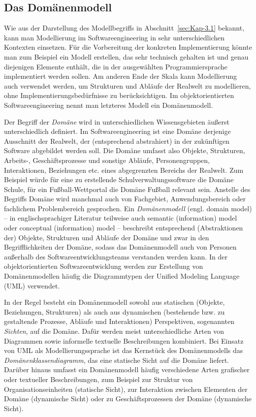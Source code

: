 \subsection{Das Domänenmodell}
\label{sec:Kap-3.2.2}

Wie aus der Darstellung des Modellbegriffs in Abschnitt~\ref{sec:Kap-3.1} bekannt, kann man Modellierung im Softwareengineering in sehr unterschiedlichen Kontexten einsetzen. Für die Vorbereitung der konkreten Implementierung könnte man zum Beispiel ein Modell erstellen, das sehr technisch gehalten ist und genau diejenigen Elemente enthält, die in der ausgewählten Programmiersprache implementiert werden sollen. Am anderen Ende der Skala kann Modellierung auch verwendet werden, um Strukturen und Abläufe der Realwelt zu modellieren, ohne Implementierungsbedürfnisse zu berücksichtigen. Im objektorientierten Softwareengineering nennt man letzteres Modell ein Domänenmodell. 

Der Begriff der \textit{Domäne} 
wird in unterschiedlichen Wissensgebieten äußerst unterschiedlich definiert. Im Softwareengineering ist eine Domäne derjenige Ausschnitt der Realwelt, der (entsprechend abstrahiert) in der zukünftigen Software abgebildet werden soll. Die Domäne umfasst also Objekte, Strukturen, Arbeits-, Geschäfts\-prozesse und sonstige Abläufe, Personengruppen, Interaktionen, Beziehungen etc. eines abgegrenzten Bereichs der Realwelt. Zum Beispiel würde für eine zu erstellende Schulverwaltungssoftware die Domäne Schule, für ein Fußball-Wettportal die Domäne Fußball relevant sein. Anstelle des Begriffs Domäne wird manchmal auch von Fachgebiet, Anwendungsbereich oder fachlichem Problembereich gesprochen. Ein \textit{Domänenmodell}
(engl. domain model) – in englischsprachiger Literatur teilweise auch semantic (information) model oder conceptual (information) model – beschreibt entsprechend (Abstraktionen der) Objekte, Strukturen und Abläufe der Domäne und zwar in den Begrifflichkeiten der Domäne, sodass das Domänenmodell auch von Personen außerhalb des Softwareentwicklungsteams verstanden werden kann. In der objektorientierten Softwareentwicklung werden zur Erstellung von Domänenmodellen häufig die Diagrammtypen der Unified Modeling Language (UML) verwendet.

In der Regel besteht ein Domänenmodell sowohl aus statischen (Objekte, Beziehungen, Strukturen) als auch aus dynamischen (bestehende bzw. zu gestaltende Pro\-zesse, Abläufe und Interaktionen) Perspektiven, sogenannten \textit{Sichten},
auf die \mbox{Domäne.} Dafür werden meist unterschiedliche Arten von Diagrammen sowie informelle textuelle Beschreibungen kombiniert. Bei  Einsatz von UML als Modellierungssprache ist das Kernstück des Domänenmodells das \textit{Domänenklassendiagramm}, das eine statische Sicht auf die Domäne liefert. Darüber hinaus umfasst ein Domänenmodell häufig verschiedene Arten grafischer oder textueller Beschreibungen, zum Beispiel zur Struktur von Organisationseinheiten (statische Sicht), zur Interaktion zwischen Elementen der Domäne (dynamische Sicht) oder zu Geschäftsprozessen der Domäne (dynamische Sicht).

